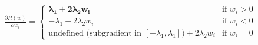 \documentclass[preview]{standalone}
\begin{document}
\begin{align*}
\frac{\partial R(w)}{\partial w_i} =\begin{cases}\mathbf{\lambda_1} + \mathbf{2\lambda_2 w_i} & \text{if } w_i > 0 \\-\lambda_1 + 2\lambda_2 w_i & \text{if } w_i < 0 \\\text{undefined (subgradient in } [-\lambda_1, \lambda_1]) + 2\lambda_2 w_i & \text{if } w_i = 0\end{cases}
\end{align*}
\end{document}
